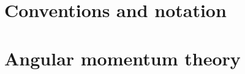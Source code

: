 \documentclass  [
  paper           = a4,
  BCOR            = 13mm, %
  twoside,
  fontsize        = 11pt, %
  DIV             = 12,   %
  chapterprefix,
  numbers         = noendperiod,
  headinclude     = true,
  footinclude     = false,
  headings        = big,
  headings        = openright,
  headsepline     = true,
  footsepline     = false,
  cleardoublepage = empty,
  titlepage       = true
]                                       {scrbook}
\begin{document}


  
  

  \frontmatter

  \tableofcontents
    \thispagestyle{plain}

  \mainmatter

  \cleardoublepage
  

  
  
  
  
  
  
   
  
  

  \cleardoublepage
  



  \cleardoublepage
  \appendix
  
  \chapter{Conventions and notation\label{app:conventions}}
  	

  \chapter{Angular momentum theory \label{app:ang_theo}}
    
    
\end{document}
